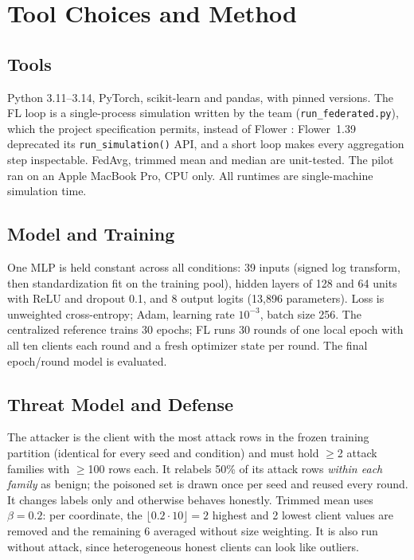 \documentclass[journal]{IEEEtran}
\begin{document}
\section{Tool Choices and Method}

\subsection{Tools}
Python 3.11--3.14, PyTorch, scikit-learn and pandas, with pinned versions.
The FL loop is a single-process simulation written by the team
(\texttt{run\_federated.py}), which the project specification permits,
instead of Flower \cite{beutel2020}: Flower~1.39 deprecated its
\texttt{run\_simulation()} API, and a short loop makes every aggregation
step inspectable. FedAvg, trimmed mean and median are unit-tested.
The pilot ran on an Apple MacBook Pro, CPU only. All runtimes are single-machine simulation time.

\subsection{Model and Training}
One MLP is held constant across all conditions: 39 inputs (signed log
transform, then standardization fit on the training pool), hidden layers of
128 and 64 units with ReLU and dropout 0.1, and 8 output logits (13{,}896
parameters). Loss is unweighted cross-entropy; Adam, learning rate
$10^{-3}$, batch size 256. The centralized reference trains 30 epochs; FL
runs 30 rounds of one local epoch with all ten clients each round and a fresh
optimizer state per round. The final epoch/round model is evaluated.

\subsection{Threat Model and Defense}
The attacker is the client with the most attack rows in the frozen training
partition (identical for every seed and condition) and must hold $\geq$2
attack families with $\geq$100 rows each. It relabels 50\% of its attack rows
\emph{within each family} as benign; the poisoned set is drawn once per seed
and reused every round. It changes labels only and otherwise behaves honestly.
Trimmed mean uses $\beta{=}0.2$: per coordinate, the $\lfloor 0.2\cdot10\rfloor{=}2$
highest and 2 lowest client values are removed and the remaining 6 averaged
without size weighting. It is also run without attack, since heterogeneous
honest clients can look like outliers.
\end{document}
